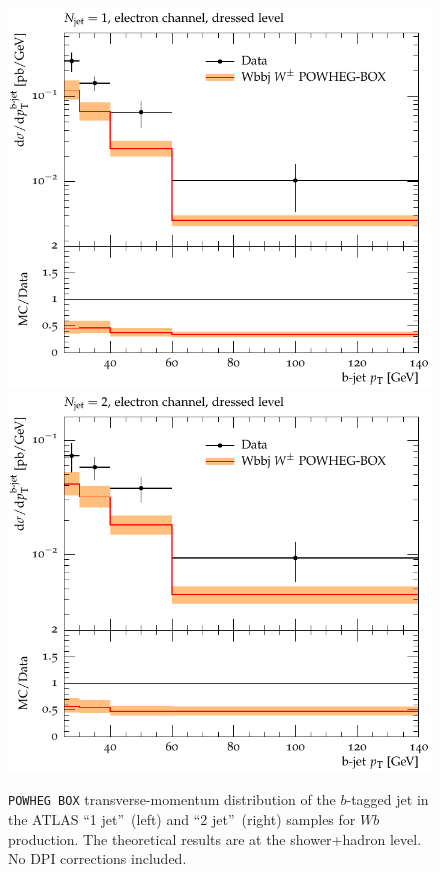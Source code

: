 \documentclass[11pt]{cernrep}
\newcommand\POWHEGBOX{{\tt POWHEG BOX}}
\begin{document}
\begin{figure}[htbp]
\begin{center}
   \includegraphics[scale=0.65]{figs/wbb/powheg/d02-x01-y01.pdf}
   \includegraphics[scale=0.65]{figs/wbb/powheg/d02-x02-y01.pdf}
\end{center}
\caption{\POWHEGBOX{} transverse-momentum distribution of the $b$-tagged jet
  in the ATLAS ``1 jet''~(left) and ``2 jet''~(right) samples for $Wb$
  production. The theoretical results are at the shower+hadron level. No DPI
  corrections included.}
\label{fig:wbb-pt-powheg}
\end{figure}
\end{document}
